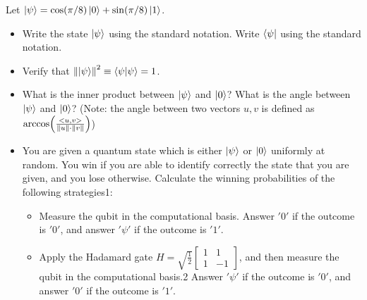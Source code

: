 Let $\ket{\psi} = \cos(\pi/8)\ket{0} + \sin(\pi/8)\ket{1}$.
\begin{itemize}
    \item[a)] Write the state $\ket{\psi}$ using the standard notation. Write $\bra{\psi}$ using the standard notation.
    \item[b)] Verify that $\norm{\ket{\psi}}^2 \equiv \braket{\psi}{\psi} = 1$.
    \item[c)] What is the inner product between $\ket{\psi}$ and $\ket{0}$? What is the angle between $\ket{\psi}$ and $\ket{0}$? (Note: the angle between two vectors $u, v$ is defined as $\arccos( \frac{<u,v>}{\norm{u}\cdot\norm{v}})$)
    \item[d)] You are given a quantum state which is either $\ket{\psi}$ or $\ket{0}$ uniformly at random.
    You win if you are able to identify correctly the state that you are given, and you lose otherwise.
    Calculate the winning probabilities of the following strategies1:
    \begin{itemize}
        \item[(a)] Measure the qubit in the computational basis.
        Answer $'0'$ if the outcome is $'0'$, and answer $'\psi'$ if the outcome is $'1'$.
        \item[(b)] Apply the Hadamard gate $H = \sqrt{\frac{1}{2}} \begin{bmatrix} 1 & 1 \\ 1 & -1 \end{bmatrix}$, and then measure the qubit in the computational basis.2 Answer $'\psi'$ if the outcome is $'0'$, and answer $'0'$ if the outcome is $'1'$.
    \end{itemize}
\end{itemize}

